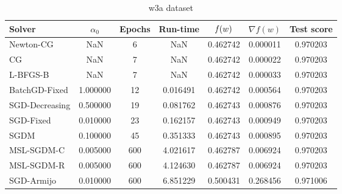 \begin{table}
\centering
\caption{w3a dataset}
\label{tab:w3a-tab}
\begin{tabular}{lS[round-precision=3]S[drop-zero-decimal]S[round-precision=4]S[round-precision=6]S[exponent-mode=scientific]S[round-precision=6]}
\toprule
Solver & {$\alpha_0$} & {Epochs} & {Run-time} & {$\operatorname*{\mathit{f}}(w)$} & {$\nabla f(w)$} & {Test score} \\
\midrule
Newton-CG & NaN & 6 & NaN & 0.462742 & 0.000011 & 0.970203 \\
CG & NaN & 7 & NaN & 0.462742 & 0.000022 & 0.970203 \\
L-BFGS-B & NaN & 7 & NaN & 0.462742 & 0.000033 & 0.970203 \\
BatchGD-Fixed & 1.000000 & 12 & 0.016491 & 0.462742 & 0.000564 & 0.970203 \\
SGD-Decreasing & 0.500000 & 19 & 0.081762 & 0.462743 & 0.000876 & 0.970203 \\
SGD-Fixed & 0.010000 & 23 & 0.162157 & 0.462743 & 0.000949 & 0.970203 \\
SGDM & 0.100000 & 45 & 0.351333 & 0.462743 & 0.000895 & 0.970203 \\
MSL-SGDM-C & 0.005000 & 600 & 4.021617 & 0.462787 & 0.006924 & 0.970203 \\
MSL-SGDM-R & 0.005000 & 600 & 4.124630 & 0.462787 & 0.006924 & 0.970203 \\
SGD-Armijo & 0.010000 & 600 & 6.851229 & 0.500431 & 0.268456 & 0.971006 \\
\bottomrule
\end{tabular}
\end{table}

